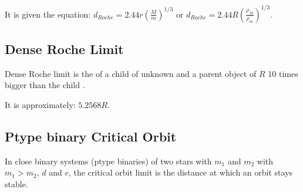 \documentclass[letterpaper,10pt,english]{sphinxmanual}
\begin{document}
\sphinxAtStartPar
It is given the equation: \(d_{Roche} = 2.44 r \left(\frac{M}{m}\right)^{1/3}\) or
\(d_{Roche} = 2.44 R \left(\frac{\rho_M}{\rho_m}\right)^{1/3}\).


\subsection{Dense Roche Limit}
\label{\detokenize{quantities/children_orbit_limits/dense_roche_limit:dense-roche-limit}}\label{\detokenize{quantities/children_orbit_limits/dense_roche_limit::doc}}\label{\detokenize{quantities/children_orbit_limits/dense_roche_limit:id1}}
\sphinxAtStartPar
Dense Roche limit is the {\hyperref[\detokenize{quantities/children_orbit_limits/roche_limit:id1}]{}} of a child of unknown {\hyperref[\detokenize{quantities/geometric/radius:id1}]{}}
and a parent object of {\hyperref[\detokenize{quantities/geometric/radius:id1}]{}} \(R\) {\hyperref[\detokenize{quantities/material/density:id1}]{}} 10 times bigger than the child {\hyperref[\detokenize{quantities/material/density:id1}]{}}.

\sphinxAtStartPar
It is approximately: \(5.2568 R\).


\subsection{P\sphinxhyphen{}type binary Critical Orbit}
\label{\detokenize{quantities/children_orbit_limits/p_type_critical_orbit:p-type-binary-critical-orbit}}\label{\detokenize{quantities/children_orbit_limits/p_type_critical_orbit::doc}}\label{\detokenize{quantities/children_orbit_limits/p_type_critical_orbit:p-type-critical-orbit}}
\sphinxAtStartPar
In close binary systems (p\sphinxhyphen{}type binaries) of two stars with {\hyperref[\detokenize{quantities/material/mass:id1}]{}}
\(m_1\) and \(m_2\) with \(m_1 > m_2\), {\hyperref[\detokenize{quantities/orbital/semi_major_axis:id1}]{}} \(d\)
and {\hyperref[\detokenize{quantities/orbital/eccentricity:id1}]{}} \(e\), the critical orbit limit
is the  distance at which an orbit stays stable.
\end{document}
